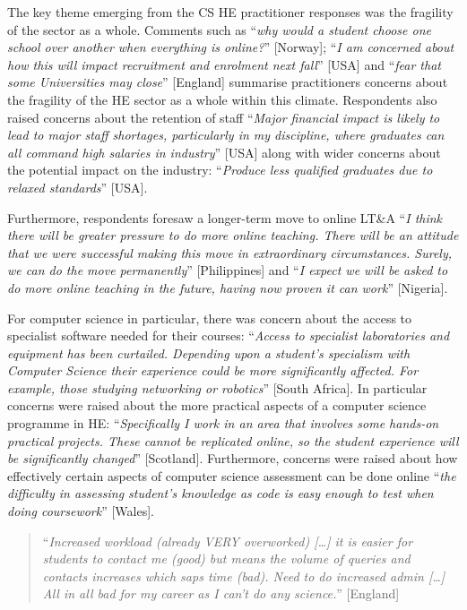 \documentclass[conference]{IEEEtran}
\begin{document}
The key theme emerging from the CS HE practitioner responses was the
fragility of the sector as a whole. Comments such as ``{\emph{why
would a student choose one school over another when everything is
online?}}'' [Norway]; ``{\emph{I am concerned about how this will
impact recruitment and enrolment next fall}}'' [USA] and ``{\emph{fear
that some Universities may close}}'' [England] summarise practitioners
concerns about the fragility of the HE sector as a whole within this
climate. Respondents also raised
concerns about the retention of staff ``{\emph{Major financial impact
is likely to lead to major staff shortages, particularly in my
discipline, where graduates can all command high salaries in
industry}}'' [USA] along with wider concerns about the potential
impact on the industry: ``{\emph{Produce less qualified graduates due
    to relaxed standards}}'' [USA].

Furthermore, respondents foresaw a longer-term move to online LT\&A
``{\emph{I think there will be greater pressure to do more online
teaching. There will be an attitude that we were successful making
this move in extraordinary circumstances. Surely, we can do the move
permanently}}'' [Philippines] and ``{\emph{I expect we will be asked
to do more online teaching in the future, having now proven it can
work}}'' [Nigeria].

For computer science in particular, there was concern about the access
to specialist software needed for their courses: ``{\emph{Access to
specialist laboratories and equipment has been curtailed. Depending
upon a student’s specialism with Computer Science their experience
could be more significantly affected. For example, those studying
networking or robotics}}'' [South Africa]. In particular concerns were
raised about the more practical aspects of a computer science
programme in HE: ``{\emph{Specifically I work in an area that involves
some hands-on practical projects. These cannot be replicated online,
so the student experience will be significantly changed}}''
[Scotland]. Furthermore, concerns were raised about how effectively certain
aspects of computer science assessment can be done online ``{\emph{the
difficulty in assessing student's knowledge as code is easy enough to
test when doing coursework}}'' [Wales].

\begin{quotation}
``{\emph{Increased workload (already VERY overworked) […]  it is
easier for students to contact me (good) but means the volume of
queries and contacts increases which saps time (bad). Need to do
increased admin […] All in all bad for my career as I can’t do any
science.}}'' [England]
\end{quotation}
\end{document}
